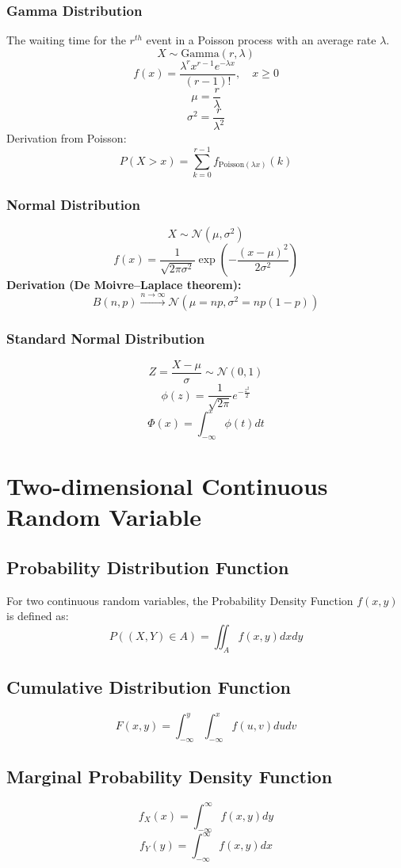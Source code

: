 \documentclass{article}
\begin{document}
\subsubsection{Gamma Distribution}
The waiting time for the \( r^{th} \) event in a Poisson process with an average rate \( \lambda \).
\[ X \sim \mathrm{Gamma}(r, \lambda) \]
\[
    f(x) = \frac{\lambda^r x^{r-1} e^{-\lambda x}}{(r-1)!}, \quad x \geq 0
\]
\[
    \mu = \frac{r}{\lambda}
\]
\[
    \sigma^2 = \frac{r}{\lambda^2}
\]
Derivation from Poisson:
\[
    P(X > x) = \sum_{k=0}^{r-1} f_{\text{Poisson}(\lambda x)}(k)
\]

\subsubsection{Normal Distribution}
\[ X \sim \mathcal{N}(\mu, \sigma^2) \]
\[
f(x) = \frac{1}{\sqrt{2\pi\sigma^2}} \exp\left( -\frac{(x-\mu)^2}{2\sigma^2} \right)
\]
\textbf{Derivation (De Moivre–Laplace theorem):}
\[
    B(n, p) \xrightarrow{n \to \infty} \mathcal{N}(\mu = np, \sigma^2 = np(1-p))
\]


\subsubsection{Standard Normal Distribution}
\[ Z = \frac{X-\mu}{\sigma} \sim \mathcal{N}(0,1) \]
\[ \phi(z) = \frac{1}{\sqrt{2\pi}} e^{-\frac{z^2}{2}} \]
\[ \Phi(x) = \int_{-\infty}^{x} \phi(t)dt \]

\newpage
\section{Two-dimensional Continuous Random Variable}

\subsection{Probability Distribution Function}
For two continuous random variables, the Probability Density Function \( f(x,y) \) is defined as:
\[
    P((X,Y) \in A) = \iint_{A} f(x,y) dx dy
\]

\subsection{Cumulative Distribution Function}
\[
    F(x,y) = \int_{-\infty}^{y} \int_{-\infty}^{x} f(u,v) du dv
\]

\subsection{Marginal Probability Density Function}
\[
    f_X(x) = \int_{-\infty}^{\infty} f(x,y)dy
\]
\[
    f_Y(y) = \int_{-\infty}^{\infty} f(x,y)dx
\]
\end{document}
